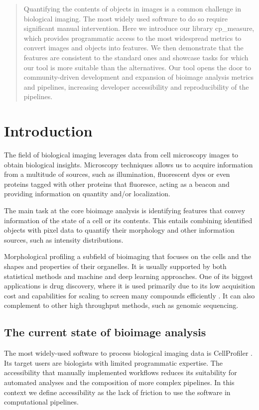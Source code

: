 \documentclass{article}
\begin{document}
\begin{abstract}
Quantifying the contents of objects in images is a common challenge in biological imaging. The most widely used software to do so require significant manual intervention. Here we introduce our library cp\_measure, which provides programmatic access to the most widespread metrics to convert images and objects into features. We then demonstrate that the features are consistent to the standard ones and showcase tasks for which our tool is more suitable than the alternatives. Our tool opens the door to community-driven  development and expansion of bioimage analysis metrics and pipelines, increasing developer accessibility and reproducibility of the pipelines.
\end{abstract}
\section{Introduction}
\label{sec:org6430daa}
The field of biological imaging leverages data from cell microscopy images to obtain biological insights. Microscopy techniques allows us to acquire information from a multitude of sources, such as illumination, fluorescent dyes or even proteins tagged with other proteins that fluoresce, acting as a beacon and providing information on quantity and/or localization.

The main task at the core bioimage analysis is identifying features that convey information of the state of a cell or its contents. This entails combining identified objects with pixel data to quantify their morphology and other information sources, such as intensity distributions.

Morphological profiling a subfield of bioimaging that focuses on the cells and the shapes and properties of their organelles. It is usually supported by both statistical methods and machine and deep learning approaches. One of its biggest applications is drug discovery, where it is used primarily due to its low acquisition cost and capabilities for scaling to screen many compounds efficiently \citep{sealDecadeSystematicReview2024}. It can also complement to other high throughput methods, such as genomic sequencing.
\subsection{The current state of bioimage analysis}
\label{sec:org8f5b33d}
The most widely-used software to process biological imaging data is CellProfiler \citep{stirlingCellProfiler4Improvements2021}. Its target users are biologists with limited programmatic expertise. The accessibility that manually implemented workflows reduces its suitability for automated analyses and the composition of more complex pipelines. In this context we define accessibility as the lack of friction to use the software in computational pipelines.
\end{document}
